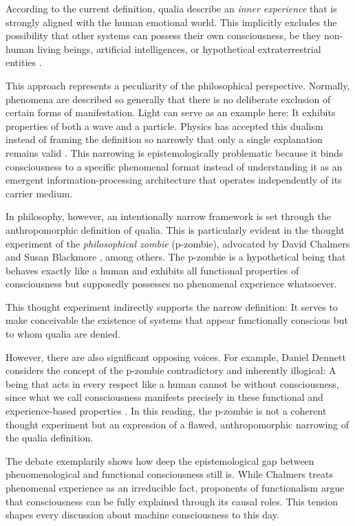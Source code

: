 According to the current definition, qualia describe an \emph{inner experience} that is strongly aligned with the human emotional world. This implicitly excludes the possibility that other systems can possess their own consciousness, be they non-human living beings, artificial intelligences, or hypothetical extraterrestrial entities \cite{Nagel1974}.

This approach represents a peculiarity of the philosophical perspective. Normally, phenomena are described so generally that there is no deliberate exclusion of certain forms of manifestation. Light can serve as an example here: It exhibits properties of both a wave and a particle. Physics has accepted this dualism instead of framing the definition so narrowly that only a single explanation remains valid \cite{Heisenberg1930}. This narrowing is epistemologically problematic because it binds consciousness to a specific phenomenal format instead of understanding it as an emergent information-processing architecture that operates independently of its carrier medium.

In philosophy, however, an intentionally narrow framework is set through the anthropomorphic definition of qualia. This is particularly evident in the thought experiment of the \emph{philosophical zombie} (p-zombie), advocated by David Chalmers \cite{Chalmers1996} and Susan Blackmore \cite{Blackmore2005}, among others. The p-zombie is a hypothetical being that behaves exactly like a human and exhibits all functional properties of consciousness but supposedly possesses no phenomenal experience whatsoever.

This thought experiment indirectly supports the narrow definition: It serves to make conceivable the existence of systems that appear functionally conscious but to whom qualia are denied.

However, there are also significant opposing voices. For example, Daniel Dennett considers the concept of the p-zombie contradictory and inherently illogical: A being that acts in every respect like a human cannot be \glqq without consciousness\grqq, since what we call consciousness manifests precisely in these functional and experience-based properties \cite{Dennett1991}. In this reading, the p-zombie is not a coherent thought experiment but an expression of a flawed, anthropomorphic narrowing of the qualia definition.

The debate exemplarily shows how deep the epistemological gap between phenomenological and functional consciousness still is. While Chalmers treats phenomenal experience as an irreducible fact, proponents of functionalism argue that consciousness can be fully explained through its causal roles. This tension shapes every discussion about machine consciousness to this day.


